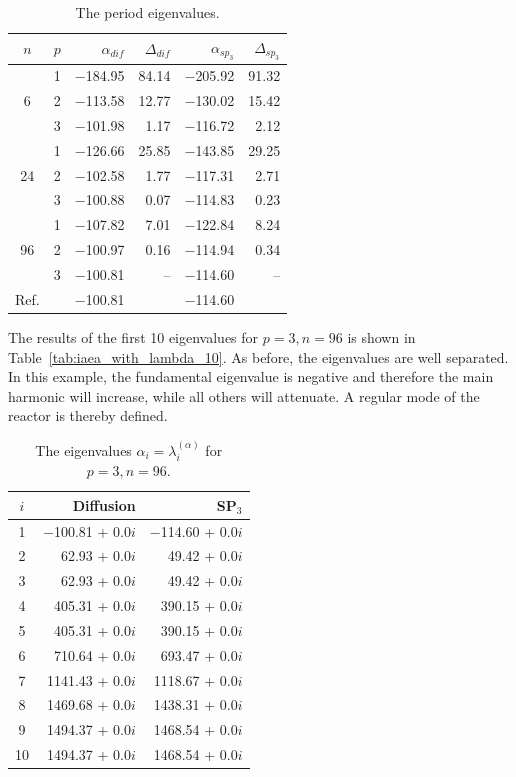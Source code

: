 \documentclass[authoryear]{elsarticle}
\begin{document}
\begin{table}[h]
\caption{The period eigenvalues.}
\label{tab:iaea_with_alpha}
\begin{center}
\begin{tabular}{c c r r r r}
\hline
$n$ & $p$ & $\alpha_{dif}$ & $\Delta_{dif}$ &$\alpha_{sp_3}$& $\Delta_{sp_3}$ \\
\hline
	& 1	& $-$184.95 & 84.14 & $-$205.92 & 91.32\\
6	& 2	& $-$113.58 & 12.77 & $-$130.02 & 15.42\\
	& 3	& $-$101.98 &  1.17 & $-$116.72 &  2.12\\ 
\hline
	& 1	& $-$126.66 & 25.85 & $-$143.85 & 29.25\\
24& 2	& $-$102.58 &  1.77 & $-$117.31 &  2.71\\
	& 3	& $-$100.88 &  0.07 & $-$114.83 &  0.23\\ 
\hline
	& 1	& $-$107.82 &  7.01 & $-$122.84 & 8.24\\
96& 2	& $-$100.97 &  0.16 & $-$114.94 & 0.34\\
	& 3	& $-$100.81 &	 -- & $-$114.60 &  -- \\ 
\hline
Ref.& & $-$100.81 & & $-$114.60 \\ 
\hline
\end{tabular}
\end{center}
\end{table}

The results of the first 10 eigenvalues for $ p = 3, n = 96 $ is shown in Table~\ref{tab:iaea_with_lambda_10}.
As before, the eigenvalues are well separated.
In this example, the fundamental eigenvalue is negative and therefore the main harmonic will increase, while all others will attenuate. 
A regular mode of the reactor is thereby defined.

\begin{table}[h]
\caption{The eigenvalues $\alpha_i=\lambda_i^{(\alpha)}$ for $p=3, n=96$.}
\label{tab:iaea_with_alpha_10}
\begin{center}
\begin{tabular}{c r r}
\hline
$i$ & Diffusion & SP$_3$ \\
\hline
1 &$-$100.81 + 0.0$i$&$-$114.60 + 0.0$i$ \\
2 &  62.93 + 0.0$i$& 49.42 + 0.0$i$ \\
3 &  62.93 + 0.0$i$& 49.42 + 0.0$i$ \\
4 & 405.31 + 0.0$i$&390.15 + 0.0$i$ \\
5 & 405.31 + 0.0$i$&390.15 + 0.0$i$ \\
6 & 710.64 + 0.0$i$&693.47 + 0.0$i$ \\
7 &1141.43 + 0.0$i$&1118.67 + 0.0$i$ \\
8 &1469.68 + 0.0$i$&1438.31 + 0.0$i$ \\
9 &1494.37 + 0.0$i$&1468.54 + 0.0$i$ \\
10&1494.37 + 0.0$i$&1468.54 + 0.0$i$ \\
\hline
\end{tabular}
\end{center}
\end{table}
\end{document}
